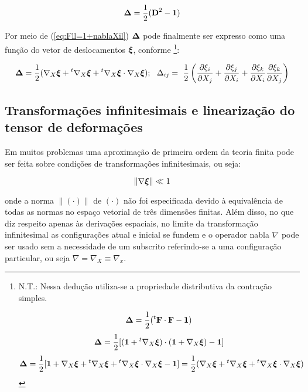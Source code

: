 \documentclass[
	11pt, %
	fleqn, %
	a4paper, %
]{LegrandOrangeBook}
\begin{document}
\begin{equation}
	\label{eq:Deltall = 1/2(D^2-1)}	
	\bm{\Delta} = \dfrac{1}{2}(\textbf{D}^2 - \bm{1})
\end{equation}

Por meio de (\ref{eq:Fll=1+nablaXil}) $\bm{\Delta}$ pode finalmente ser expresso como uma função do vetor de deslocamentos $\bm{\xi}$, conforme \footnote{N.T.: Nessa dedução utiliza-se a propriedade distributiva da contração simples.

\begin{displaymath}	
	\bm{\Delta} = \dfrac{1}{2}({}^t\textbf{F} \cdot \textbf{F} - \bm{1})
\end{displaymath}
\begin{displaymath}	
	\bm{\Delta} = \dfrac{1}{2}[(\bm{1}+{}^t\nabla_X\bm{\xi}) \cdot (\bm{1}+\nabla_X\bm{\xi}) - \bm{1}]
\end{displaymath}
\begin{displaymath}	
	\bm{\Delta} = \dfrac{1}{2}[\bm{1}+\nabla_X\bm{\xi}+{}^t\nabla_X\bm{\xi}+ {}^t\nabla_X\bm{\xi} \cdot \nabla_X\bm{\xi} - \bm{1}] = \dfrac{1}{2}(\nabla_X \bm{\xi} + {}^t\nabla_X \bm{\xi}+{}^t\nabla_X \bm{\xi} \cdot \nabla_X \bm{\xi})
\end{displaymath}

}:

\begin{equation}
	\label{eq:Deltall2}	
	\bm{\Delta} = \dfrac{1}{2}(\nabla_X \bm{\xi} + {}^t\nabla_X \bm{\xi}+{}^t\nabla_X \bm{\xi} \cdot \nabla_X \bm{\xi}) ;~~ \Delta_{ij}=~\dfrac{1}{2}\left( \dfrac{\partial \xi_i}{\partial X_j} + \dfrac{\partial \xi_j}{\partial X_i} + \dfrac{\partial \xi_k}{\partial X_i} \dfrac{\partial \xi_k}{\partial X_j} \right)
\end{equation}


\subsection{Transformações infinitesimais e linearização do tensor de deformações}

Em muitos problemas uma aproximação de primeira ordem da teoria finita pode ser feita sobre condições de transformações infinitesimais, ou seja:

\begin{equation}
	\label{eq:HTI}	
	\| \nabla \bm{\xi} \| \ll 1
\end{equation}

onde a norma $\|(\cdot)\|$ de $(\cdot)$ não foi especificada devido à equivalência de todas as normas no espaço vetorial de três dimensões finitas. Além disso, no que diz respeito apenas às derivações espaciais, no limite da transformação infinitesimal as configurações atual e inicial se fundem e o operador nabla $\nabla$ pode ser usado sem a necessidade de um subscrito referindo-se a uma configuração particular, ou seja $\nabla = \nabla_X \equiv \nabla_x$.
\end{document}
